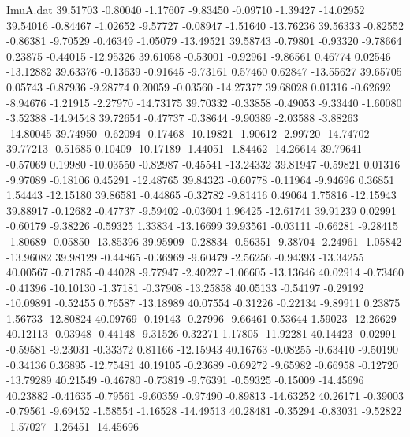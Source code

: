 \begin{filecontents}{ImuA.dat}
  39.51703   -0.80040   -1.17607   -9.83450   -0.09710   -1.39427  -14.02952
  39.54016   -0.84467   -1.02652   -9.57727   -0.08947   -1.51640  -13.76236
  39.56333   -0.82552   -0.86381   -9.70529   -0.46349   -1.05079  -13.49521
  39.58743   -0.79801   -0.93320   -9.78664    0.23875   -0.44015  -12.95326
  39.61058   -0.53001   -0.92961   -9.86561    0.46774    0.02546  -13.12882
  39.63376   -0.13639   -0.91645   -9.73161    0.57460    0.62847  -13.55627
  39.65705    0.05743   -0.87936   -9.28774    0.20059   -0.03560  -14.27377
  39.68028    0.01316   -0.62692   -8.94676   -1.21915   -2.27970  -14.73175
  39.70332   -0.33858   -0.49053   -9.33440   -1.60080   -3.52388  -14.94548
  39.72654   -0.47737   -0.38644   -9.90389   -2.03588   -3.88263  -14.80045
  39.74950   -0.62094   -0.17468  -10.19821   -1.90612   -2.99720  -14.74702
  39.77213   -0.51685    0.10409  -10.17189   -1.44051   -1.84462  -14.26614
  39.79641   -0.57069    0.19980  -10.03550   -0.82987   -0.45541  -13.24332
  39.81947   -0.59821    0.01316   -9.97089   -0.18106    0.45291  -12.48765
  39.84323   -0.60778   -0.11964   -9.94696    0.36851    1.54443  -12.15180
  39.86581   -0.44865   -0.32782   -9.81416    0.49064    1.75816  -12.15943
  39.88917   -0.12682   -0.47737   -9.59402   -0.03604    1.96425  -12.61741
  39.91239    0.02991   -0.60179   -9.38226   -0.59325    1.33834  -13.16699
  39.93561   -0.03111   -0.66281   -9.28415   -1.80689   -0.05850  -13.85396
  39.95909   -0.28834   -0.56351   -9.38704   -2.24961   -1.05842  -13.96082
  39.98129   -0.44865   -0.36969   -9.60479   -2.56256   -0.94393  -13.34255
  40.00567   -0.71785   -0.44028   -9.77947   -2.40227   -1.06605  -13.13646
  40.02914   -0.73460   -0.41396  -10.10130   -1.37181   -0.37908  -13.25858
  40.05133   -0.54197   -0.29192  -10.09891   -0.52455    0.76587  -13.18989
  40.07554   -0.31226   -0.22134   -9.89911    0.23875    1.56733  -12.80824
  40.09769   -0.19143   -0.27996   -9.66461    0.53644    1.59023  -12.26629
  40.12113   -0.03948   -0.44148   -9.31526    0.32271    1.17805  -11.92281
  40.14423   -0.02991   -0.59581   -9.23031   -0.33372    0.81166  -12.15943
  40.16763   -0.08255   -0.63410   -9.50190   -0.34136    0.36895  -12.75481
  40.19105   -0.23689   -0.69272   -9.65982   -0.66958   -0.12720  -13.79289
  40.21549   -0.46780   -0.73819   -9.76391   -0.59325   -0.15009  -14.45696
  40.23882   -0.41635   -0.79561   -9.60359   -0.97490   -0.89813  -14.63252
  40.26171   -0.39003   -0.79561   -9.69452   -1.58554   -1.16528  -14.49513
  40.28481   -0.35294   -0.83031   -9.52822   -1.57027   -1.26451  -14.45696

\end{filecontents}
